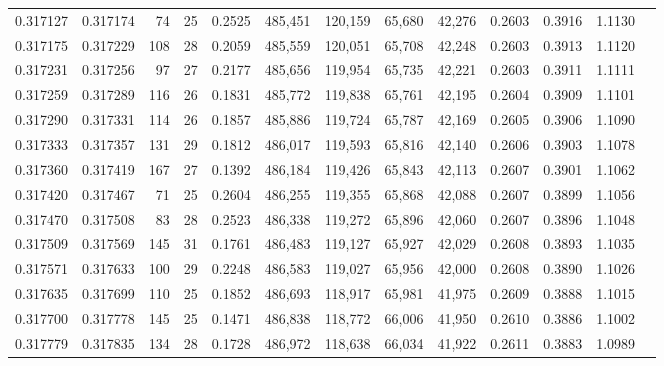 \begin{tabular}{rrrrrrrrrrrrr}
0.317127 & 0.317174 &    74 &  25 &                                     0.2525 & 485,451 & 120,159 &  65,680 &  42,276 & 0.2603 & 0.3916 & 1.1130 \\
0.317175 & 0.317229 &   108 &  28 &                                     0.2059 & 485,559 & 120,051 &  65,708 &  42,248 & 0.2603 & 0.3913 & 1.1120 \\
0.317231 & 0.317256 &    97 &  27 &                                     0.2177 & 485,656 & 119,954 &  65,735 &  42,221 & 0.2603 & 0.3911 & 1.1111 \\
0.317259 & 0.317289 &   116 &  26 &                                     0.1831 & 485,772 & 119,838 &  65,761 &  42,195 & 0.2604 & 0.3909 & 1.1101 \\
0.317290 & 0.317331 &   114 &  26 &                                     0.1857 & 485,886 & 119,724 &  65,787 &  42,169 & 0.2605 & 0.3906 & 1.1090 \\
0.317333 & 0.317357 &   131 &  29 &                                     0.1812 & 486,017 & 119,593 &  65,816 &  42,140 & 0.2606 & 0.3903 & 1.1078 \\
0.317360 & 0.317419 &   167 &  27 &                                     0.1392 & 486,184 & 119,426 &  65,843 &  42,113 & 0.2607 & 0.3901 & 1.1062 \\
0.317420 & 0.317467 &    71 &  25 &                                     0.2604 & 486,255 & 119,355 &  65,868 &  42,088 & 0.2607 & 0.3899 & 1.1056 \\
0.317470 & 0.317508 &    83 &  28 &                                     0.2523 & 486,338 & 119,272 &  65,896 &  42,060 & 0.2607 & 0.3896 & 1.1048 \\
0.317509 & 0.317569 &   145 &  31 &                                     0.1761 & 486,483 & 119,127 &  65,927 &  42,029 & 0.2608 & 0.3893 & 1.1035 \\
0.317571 & 0.317633 &   100 &  29 &                                     0.2248 & 486,583 & 119,027 &  65,956 &  42,000 & 0.2608 & 0.3890 & 1.1026 \\
0.317635 & 0.317699 &   110 &  25 &                                     0.1852 & 486,693 & 118,917 &  65,981 &  41,975 & 0.2609 & 0.3888 & 1.1015 \\
0.317700 & 0.317778 &   145 &  25 &                                     0.1471 & 486,838 & 118,772 &  66,006 &  41,950 & 0.2610 & 0.3886 & 1.1002 \\
0.317779 & 0.317835 &   134 &  28 &                                     0.1728 & 486,972 & 118,638 &  66,034 &  41,922 & 0.2611 & 0.3883 & 1.0989 \\

\end{tabular}
